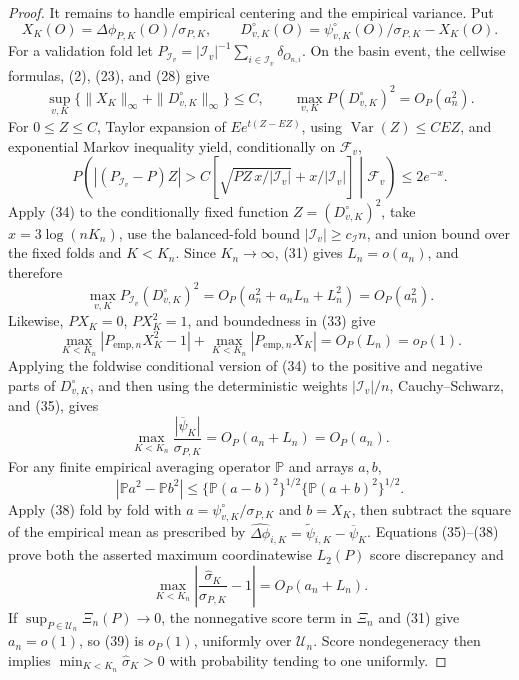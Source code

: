 \documentclass{article}
\begin{document}
\begin{proof}
It remains to handle empirical centering and the empirical variance.  Put
\[
 X_K(O)=\Delta\phi_{P,K}(O)/\sigma_{P,K},\qquad
 D_{v,K}^{\circ}(O)=\psi_{v,K}^{\circ}(O)/\sigma_{P,K}-X_K(O).
\]
For a validation fold let \(P_{\mathcal I_v}=|\mathcal I_v|^{-1}\sum_{i\in\mathcal I_v}\delta_{O_{n,i}}\).  On the basin event, the cellwise formulas, (2), (23), and (28) give
\[
 \sup_{v,K}\{\|X_K\|_\infty+\|D_{v,K}^{\circ}\|_\infty\}\leq C,
 \qquad \max_{v,K}P(D_{v,K}^{\circ})^2=O_P(a_n^2).                         \tag{33}
\]
For \(0\leq Z\leq C\), Taylor expansion of \(Ee^{t(Z-EZ)}\), using \(\operatorname{Var}(Z)\leq CEZ\), and exponential Markov inequality yield, conditionally on \(\mathcal F_v\),
\[
 P\!\left(\left|(P_{\mathcal I_v}-P)Z\right|>
 C\left[\sqrt{PZ\,x/|\mathcal I_v|}+x/|\mathcal I_v|\right]
 \middle|\mathcal F_v\right)\leq2e^{-x}.                                  \tag{34}
\]
Apply (34) to the conditionally fixed function \(Z=(D_{v,K}^{\circ})^2\), take \(x=3\log(nK_n)\), use the balanced-fold bound \(|\mathcal I_v|\geq c_{\mathcal I}n\), and union bound over the fixed folds and \(K<K_n\).  Since \(K_n\to\infty\), (31) gives \(L_n=o(a_n)\), and therefore
\[
 \max_{v,K}P_{\mathcal I_v}(D_{v,K}^{\circ})^2
 =O_P\!\left(a_n^2+a_nL_n+L_n^2\right)=O_P(a_n^2).                         \tag{35}
\]
Likewise, \(PX_K=0\), \(PX_K^2=1\), and boundedness in (33) give
\[
 \max_{K<K_n}|P_{\mathrm{emp},n}X_K^2-1|
 +\max_{K<K_n}|P_{\mathrm{emp},n}X_K|=O_P(L_n)=o_P(1).                    \tag{36}
\]
Applying the foldwise conditional version of (34) to the positive and negative parts of \(D_{v,K}^{\circ}\), and then using the deterministic weights \(|\mathcal I_v|/n\), Cauchy--Schwarz, and (35), gives
\[
 \max_{K<K_n}\frac{|\overline\psi_K|}{\sigma_{P,K}}
 =O_P(a_n+L_n)=O_P(a_n).                                                     \tag{37}
\]
For any finite empirical averaging operator \(\mathbb P\) and arrays \(a,b\),
\[
 |\mathbb P a^2-\mathbb P b^2|
 \leq\{\mathbb P(a-b)^2\}^{1/2}\{\mathbb P(a+b)^2\}^{1/2}.              \tag{38}
\]
Apply (38) fold by fold with \(a=\psi_{v,K}^{\circ}/\sigma_{P,K}\) and \(b=X_K\), then subtract the square of the empirical mean as prescribed by \(\widehat{\Delta\phi}_{i,K}=\widetilde\psi_{i,K}-\overline\psi_K\).  Equations (35)--(38) prove both the asserted maximum coordinatewise \(L_2(P)\) score discrepancy and
\[
 \max_{K<K_n}\left|\frac{\widehat\sigma_K}{\sigma_{P,K}}-1\right|
 =O_P(a_n+L_n).                                                              \tag{39}
\]
If \(\sup_{P\in\mathcal U_n}\Xi_n(P)\to0\), the nonnegative score term in \(\Xi_n\) and (31) give \(a_n=o(1)\), so (39) is \(o_P(1)\), uniformly over \(\mathcal U_n\).  Score nondegeneracy then implies \(\min_{K<K_n}\widehat\sigma_K>0\) with probability tending to one uniformly.


\end{proof}
\end{document}
